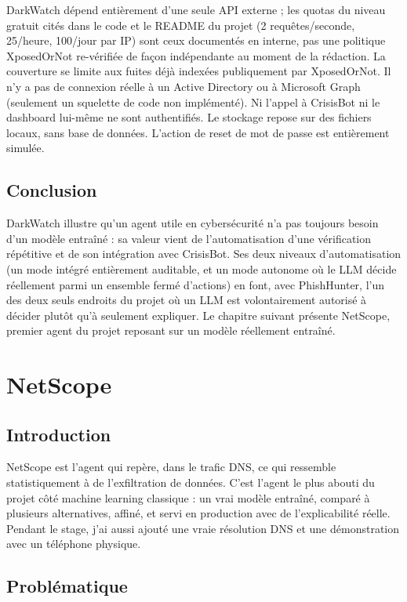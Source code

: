 \documentclass[12pt,a4paper]{report}
\begin{document}
DarkWatch dépend entièrement d'une seule API externe ; les quotas du niveau gratuit cités dans le code et le README du projet (2 requêtes/seconde, 25/heure, 100/jour par IP) sont ceux documentés en interne, pas une politique XposedOrNot re-vérifiée de façon indépendante au moment de la rédaction. La couverture se limite aux fuites déjà indexées publiquement par XposedOrNot. Il n'y a pas de connexion réelle à un Active Directory ou à Microsoft Graph (seulement un squelette de code non implémenté). Ni l'appel à CrisisBot ni le dashboard lui-même ne sont authentifiés. Le stockage repose sur des fichiers locaux, sans base de données. L'action de reset de mot de passe est entièrement simulée.

\section{Conclusion}

DarkWatch illustre qu'un agent utile en cybersécurité n'a pas toujours besoin d'un modèle entraîné : sa valeur vient de l'automatisation d'une vérification répétitive et de son intégration avec CrisisBot. Ses deux niveaux d'automatisation (un mode intégré entièrement auditable, et un mode autonome où le LLM décide réellement parmi un ensemble fermé d'actions) en font, avec PhishHunter, l'un des deux seuls endroits du projet où un LLM est volontairement autorisé à décider plutôt qu'à seulement expliquer. Le chapitre suivant présente NetScope, premier agent du projet reposant sur un modèle réellement entraîné.

\chapter{NetScope}

\section{Introduction}

NetScope est l'agent qui repère, dans le trafic DNS, ce qui ressemble statistiquement à de l'exfiltration de données. C'est l'agent le plus abouti du projet côté machine learning classique : un vrai modèle entraîné, comparé à plusieurs alternatives, affiné, et servi en production avec de l'explicabilité réelle. Pendant le stage, j'ai aussi ajouté une vraie résolution DNS et une démonstration avec un téléphone physique.

\section{Problématique}
\end{document}
